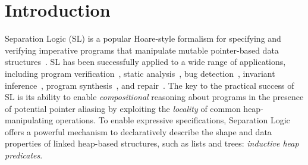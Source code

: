 
\section{Introduction}
\label{sec:intro}

Separation Logic (SL) is a popular Hoare-style formalism for
specifying and verifying imperative programs that manipulate mutable
pointer-based data
structures~\cite{reynolds2002separation,OHearn-al:CSL01}. 
%
SL has been successfully applied to a wide range of applications,
including program verification~\cite{Appel-al:BOOK14,Jacobs-al:NFM11}, static
analysis~\cite{Calcagno-Distefano:NFM11}, bug
detection~\cite{LeRVBDO22}, invariant inference~\cite{le2019sling,DBLP:phd/basesearch/Dohrau22},
program synthesis~\cite{WatanabeGPPS21,polikarpova2019structuring}, and
repair~\cite{Tonder-LeGoues:ICSE18,NguyenTSC21}.
%
The key to the practical success of SL is its ability to enable
\emph{compositional} reasoning about programs in the presence of
potential pointer aliasing by exploiting the \emph{locality} of common
heap-manipulating operations. 
%
% 
To enable expressive specifications, Separation Logic offers a
powerful mechanism to declaratively describe the shape and data
properties of linked heap-based structures, such as lists and trees:
\emph{inductive heap predicates}.
%
